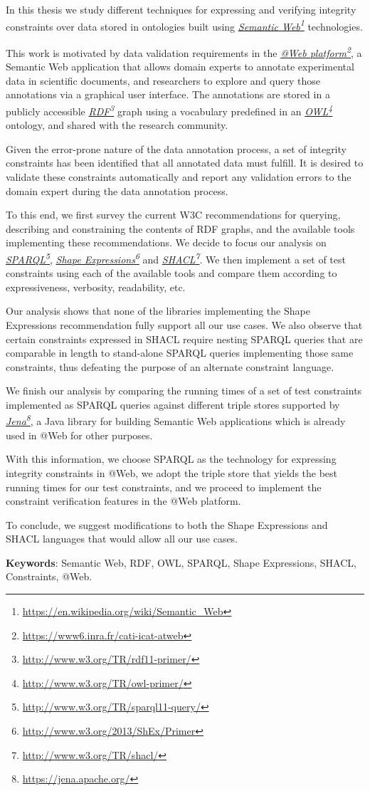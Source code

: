 \documentclass[a4paper, 10pt]{article}
\newcommand{\fnhref}[2]{\href{#2}{#1}\footnote{\url{#2}}}
\newcommand{\ifnhref}[2]{\textit{\fnhref{#1}{#2}}}
\begin{document}
In this thesis we study different techniques for expressing and verifying
integrity constraints over data stored in ontologies built using
\ifnhref{Semantic Web}{https://en.wikipedia.org/wiki/Semantic\_Web}
technologies.

This work is motivated by data validation requirements in the \ifnhref{@Web
platform}{https://www6.inra.fr/cati-icat-atweb}, a Semantic Web application
that allows domain experts to annotate experimental data in scientific
documents, and researchers to explore and query those annotations via a
graphical user interface. The annotations are stored in a publicly accessible
\ifnhref{RDF}{http://www.w3.org/TR/rdf11-primer/} graph using a vocabulary
predefined in an \ifnhref{OWL}{http://www.w3.org/TR/owl-primer/} ontology, and
shared with the research community.

Given the error-prone nature of the data annotation process, a set of integrity
constraints has been identified that all annotated data must fulfill. It is
desired to validate these constraints automatically and report any validation
errors to the domain expert during the data annotation process.

To this end, we first survey the current W3C recommendations for querying,
describing and constraining the contents of RDF graphs, and the available tools
implementing these recommendations. We decide to focus our analysis on
\ifnhref{SPARQL}{http://www.w3.org/TR/sparql11-query/}, \ifnhref{Shape
Expressions}{http://www.w3.org/2013/ShEx/Primer} and
\ifnhref{SHACL}{http://www.w3.org/TR/shacl/}. We then implement a set of test
constraints using each of the available tools and compare them according to
expressiveness, verbosity, readability, etc.

Our analysis shows that none of the libraries implementing the Shape
Expressions recommendation fully support all our use cases. We also observe
that certain constraints expressed in SHACL require nesting SPARQL queries that
are comparable in length to stand-alone SPARQL queries implementing those same
constraints, thus defeating the purpose of an alternate constraint language.

We finish our analysis by comparing the running times of a set of test
constraints implemented as SPARQL queries against different triple stores
supported by \ifnhref{Jena}{https://jena.apache.org/}, a Java library for
building Semantic Web applications which is already used in @Web for other
purposes.

With this information, we choose SPARQL as the technology for expressing
integrity constraints in @Web, we adopt the triple store that yields the best
running times for our test constraints, and we proceed to implement the
constraint verification features in the @Web platform.

To conclude, we suggest modifications to both the Shape Expressions and SHACL
languages that would allow all our use cases.

\textbf{Keywords}: Semantic Web, RDF, OWL, SPARQL, Shape Expressions, SHACL,
Constraints, @Web.
\end{document}

